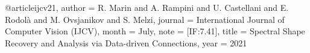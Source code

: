 @article{ijcv21,
 author = {R. Marin and A. Rampini and U. Castellani and E. Rodolà and M. Ovsjanikov and S. Melzi},
 journal = {International Journal of Computer Vision (IJCV)},
 month = {July},
 note = {[IF:7.41]},
 title = {Spectral Shape Recovery and Analysis via Data-driven Connections},
 year = {2021}
}